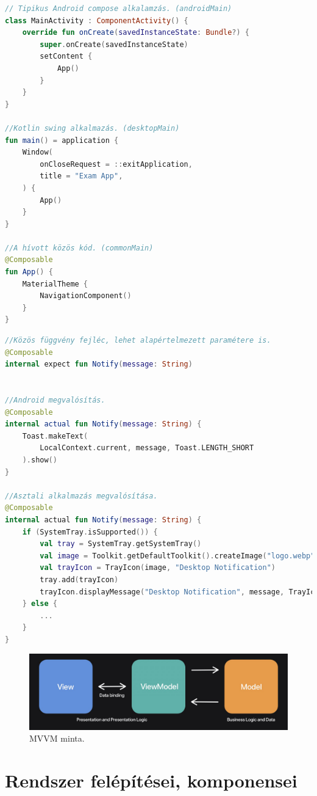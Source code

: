 \begin{lstlisting}[caption={Alkalamzás elindítása}, label={lst:Start}, language=Kotlin]
// Tipikus Android compose alkalamzás. (androidMain)
class MainActivity : ComponentActivity() {
    override fun onCreate(savedInstanceState: Bundle?) {
        super.onCreate(savedInstanceState)
        setContent {
            App()
        }
    }
}

//Kotlin swing alkalmazás. (desktopMain)
fun main() = application {
    Window(
        onCloseRequest = ::exitApplication,
        title = "Exam App",
    ) {
        App()
    }
}

//A hívott közös kód. (commonMain)
@Composable
fun App() {
    MaterialTheme {
        NavigationComponent()
    }
}
\end{lstlisting}

\begin{lstlisting}[caption={Egyszerűbb példa az expect és actual függvények használatára. Debugolás során használt kódrészlet.}, label={lst:ExpectActualSample}, language=Kotlin]
//Közös függvény fejléc, lehet alapértelmezett paramétere is.
@Composable
internal expect fun Notify(message: String)


//Android megvalósítás.
@Composable
internal actual fun Notify(message: String) {
    Toast.makeText(
        LocalContext.current, message, Toast.LENGTH_SHORT
    ).show()
}

//Asztali alkalmazás megvalósítása.
@Composable
internal actual fun Notify(message: String) {
    if (SystemTray.isSupported()) {
        val tray = SystemTray.getSystemTray()
        val image = Toolkit.getDefaultToolkit().createImage("logo.webp")
        val trayIcon = TrayIcon(image, "Desktop Notification")
        tray.add(trayIcon)
        trayIcon.displayMessage("Desktop Notification", message, TrayIcon.MessageType.INFO)
    } else {
        ...
    }
}
\end{lstlisting}

\begin{figure}[!ht]
    \centering
    \includegraphics[width=150mm, keepaspectratio]{figures/MVVM-architectural-pattern.png}
    \caption{MVVM minta. \cite{MVVMArchitecture}}
    \label{fig:MVVMArchitecture}
\end{figure}

\section{Rendszer felépítései, komponensei}
\label{sec:Komponents}